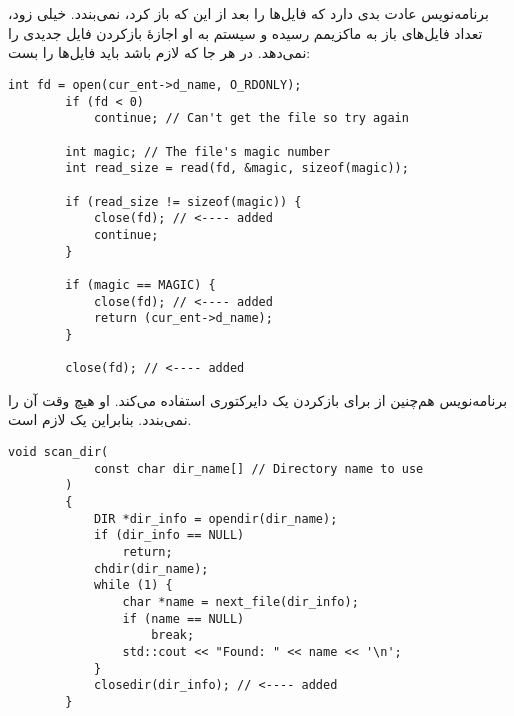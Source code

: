 \section{}
\paragraph{}\label{answer:60}
 برنامه‌نویس عادت بدی دارد که فایل‌ها را بعد از این که باز کرد، نمی‌بندد. خیلی زود، تعداد فایل‌های باز به ماکزیمم رسیده و سیستم به او اجازهٔ بازکردن فایل جدیدی را نمی‌دهد. در هر جا که لازم باشد باید فایل‌ها را بست:
 \begin{LTR}
    \begin{lstlisting}[style=C++Style]
        int fd = open(cur_ent->d_name, O_RDONLY);
        if (fd < 0)
            continue; // Can't get the file so try again

        int magic; // The file's magic number
        int read_size = read(fd, &magic, sizeof(magic));

        if (read_size != sizeof(magic)) {
            close(fd); // <---- added
            continue;
        }

        if (magic == MAGIC) {
            close(fd); // <---- added
            return (cur_ent->d_name);
        }

        close(fd); // <---- added
    \end{lstlisting}
\end{LTR}

برنامه‌نویس هم‌چنین از  برای بازکردن یک دایرکتوری استفاده می‌کند. او هیچ وقت آن را نمی‌بندد. بنابراین یک  لازم است.
\begin{LTR}
    \begin{lstlisting}[style=C++Style]
        void scan_dir(
            const char dir_name[] // Directory name to use
        )
        {
            DIR *dir_info = opendir(dir_name);
            if (dir_info == NULL)
                return;
            chdir(dir_name);
            while (1) {
                char *name = next_file(dir_info);
                if (name == NULL)
                    break;
                std::cout << "Found: " << name << '\n';
            }
            closedir(dir_info); // <---- added
        }
    \end{lstlisting}
\end{LTR}